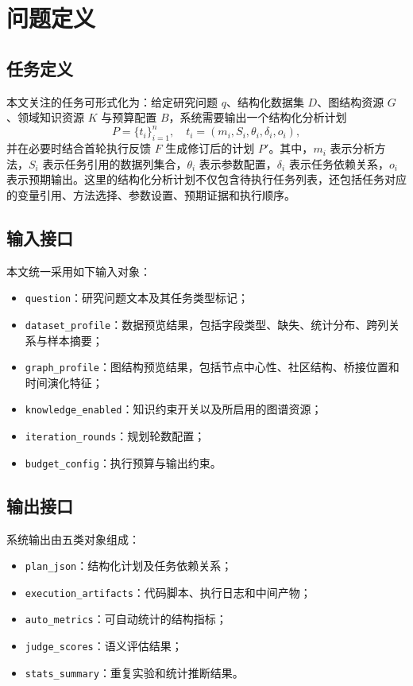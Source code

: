 \section{问题定义}

\subsection{任务定义}

本文关注的任务可形式化为：给定研究问题 $q$、结构化数据集 $D$、图结构资源 $G$、领域知识资源 $K$ 与预算配置 $B$，系统需要输出一个结构化分析计划
\[
P=\{t_i\}_{i=1}^{n},\quad
t_i=(m_i, S_i, \theta_i, \delta_i, o_i),
\]
并在必要时结合首轮执行反馈 $F$ 生成修订后的计划 $P'$。其中，$m_i$ 表示分析方法，$S_i$ 表示任务引用的数据列集合，$\theta_i$ 表示参数配置，$\delta_i$ 表示任务依赖关系，$o_i$ 表示预期输出。这里的结构化分析计划不仅包含待执行任务列表，还包括任务对应的变量引用、方法选择、参数设置、预期证据和执行顺序。

\subsection{输入接口}

本文统一采用如下输入对象：

\begin{itemize}
  \item \texttt{question}：研究问题文本及其任务类型标记；
  \item \texttt{dataset\_profile}：数据预览结果，包括字段类型、缺失、统计分布、跨列关系与样本摘要；
  \item \texttt{graph\_profile}：图结构预览结果，包括节点中心性、社区结构、桥接位置和时间演化特征；
  \item \texttt{knowledge\_enabled}：知识约束开关以及所启用的图谱资源；
  \item \texttt{iteration\_rounds}：规划轮数配置；
  \item \texttt{budget\_config}：执行预算与输出约束。
\end{itemize}

\subsection{输出接口}

系统输出由五类对象组成：

\begin{itemize}
  \item \texttt{plan\_json}：结构化计划及任务依赖关系；
  \item \texttt{execution\_artifacts}：代码脚本、执行日志和中间产物；
  \item \texttt{auto\_metrics}：可自动统计的结构指标；
  \item \texttt{judge\_scores}：语义评估结果；
  \item \texttt{stats\_summary}：重复实验和统计推断结果。
\end{itemize}


